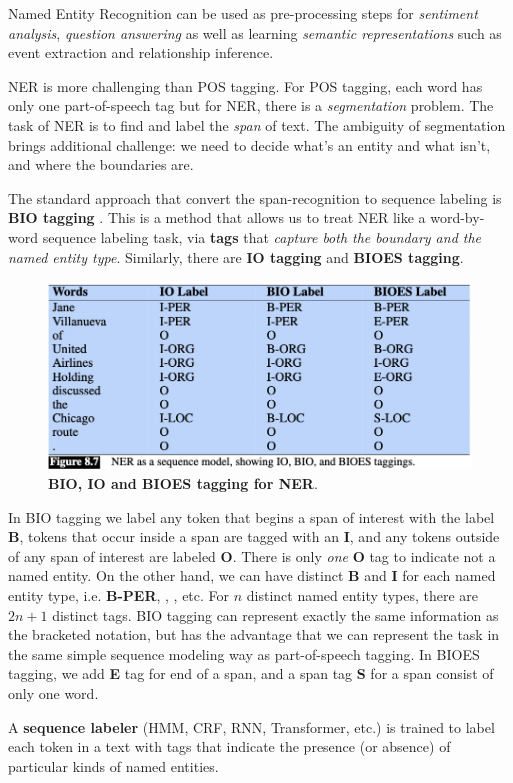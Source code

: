 \documentclass[11pt]{article}
\begin{document}
Named Entity Recognition can be used as pre-processing steps for \emph{sentiment analysis}, \emph{question answering} as well as learning \emph{semantic representations} such as event extraction and relationship inference. 

NER is more challenging than POS tagging. For POS tagging, each word has only one part-of-speech tag but for NER, there is a \emph{segmentation} problem. The task of NER is to find and label the \emph{span} of text. The ambiguity of segmentation brings additional challenge: we need to decide what’s an entity and what isn’t, and where the boundaries are. 

The standard approach that convert the span-recognition to sequence labeling is \textbf{BIO tagging} \citep{jurafsky2014speech}. This is a method that allows us to treat NER like a word-by-word sequence labeling task, via \textbf{tags} that \emph{capture both the boundary and the named entity type}. Similarly, there are \textbf{IO tagging} and \textbf{BIOES tagging}.

\begin{figure}
\begin{minipage}[t]{1\linewidth}
  \centering
  \centerline{\includegraphics[scale = 0.4]{bio_tagging.png}}
\end{minipage}
\caption{\footnotesize{\textbf{BIO, IO and BIOES tagging for NER}.}}
\label{fig: ner_bio_example}
\end{figure}

In BIO tagging we label any token that begins a span of interest with the label \textbf{B}, tokens that occur inside a span are tagged with an \textbf{I}, and any tokens outside of any span of interest are labeled \textbf{O}. There is only \emph{one} \textbf{O} tag to indicate not a named entity. On the other hand, we can have distinct \textbf{B} and \textbf{I} for each named entity type, i.e. \textbf{B-PER}, , ,  etc. For $n$ distinct named entity types, there are $2n + 1$ distinct tags. BIO tagging can represent exactly the same information as the bracketed notation, but has the advantage that we can represent the task in the same simple sequence modeling way as part-of-speech tagging. In BIOES tagging, we add \textbf{E} tag for end of a span, and a span tag \textbf{S} for a span consist of only one word.  

A \textbf{sequence labeler} (HMM, CRF, RNN, Transformer, etc.) is trained to label each token in a text with tags that indicate the presence (or absence) of particular kinds of named entities.

\newpage


\end{document}
